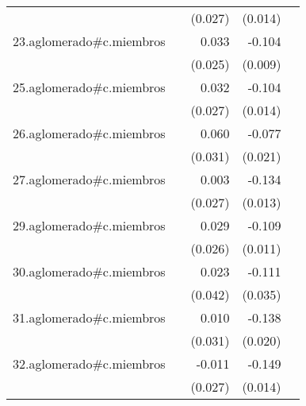 {\begin{longtable}{l*{4}{D{.}{.}{-1}}}
            &                     &     (0.027)         &     (0.014)         &                     \\
\addlinespace
23.aglomerado#c.miembros&                     &       0.033         &      -0.104\sym{***}&                     \\
            &                     &     (0.025)         &     (0.009)         &                     \\
\addlinespace
25.aglomerado#c.miembros&                     &       0.032         &      -0.104\sym{***}&                     \\
            &                     &     (0.027)         &     (0.014)         &                     \\
\addlinespace
26.aglomerado#c.miembros&                     &       0.060         &      -0.077\sym{***}&                     \\
            &                     &     (0.031)         &     (0.021)         &                     \\
\addlinespace
27.aglomerado#c.miembros&                     &       0.003         &      -0.134\sym{***}&                     \\
            &                     &     (0.027)         &     (0.013)         &                     \\
\addlinespace
29.aglomerado#c.miembros&                     &       0.029         &      -0.109\sym{***}&                     \\
            &                     &     (0.026)         &     (0.011)         &                     \\
\addlinespace
30.aglomerado#c.miembros&                     &       0.023         &      -0.111\sym{**} &                     \\
            &                     &     (0.042)         &     (0.035)         &                     \\
\addlinespace
31.aglomerado#c.miembros&                     &       0.010         &      -0.138\sym{***}&                     \\
            &                     &     (0.031)         &     (0.020)         &                     \\
\addlinespace
32.aglomerado#c.miembros&                     &      -0.011         &      -0.149\sym{***}&                     \\
            &                     &     (0.027)         &     (0.014)         &                     \\

\end{longtable}}
